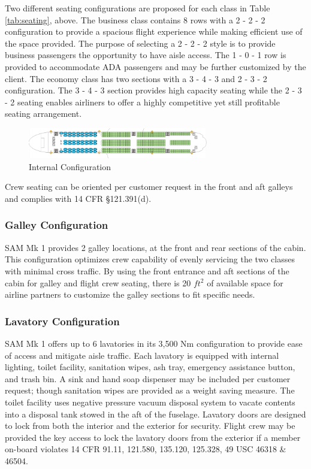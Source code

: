 Two different seating configurations are proposed for each class in Table \ref{tab:seating}, above.  The business class contains 8 rows with a 2 - 2 - 2 configuration to provide a spacious flight experience while making efficient use of the space provided.  The purpose of selecting a 2 - 2 - 2 style is to provide business passengers the opportunity to have aisle access.  The 1 - 0 - 1 row is provided to accommodate ADA passengers \cite{adaseating} and may be further customized by the client.  The economy class has two sections with a 3 - 4 - 3 and 2 - 3 - 2 configuration.  The 3 - 4 - 3 section provides high capacity seating while the 2 - 3 - 2 seating enables airliners to offer a highly competitive yet still profitable seating arrangement.

\begin{figure}[!h]
    \centering
    \includegraphics[width=0.7\textwidth]{Photos/Config undimensioned.png}
    \caption{Internal Configuration}
    \label{fig:internalConfig}
\end{figure}

Crew seating can be oriented per customer request in the front and aft galleys and complies with 14 CFR \S 121.391(d).

\subsubsection{Galley Configuration}
SAM Mk 1 provides 2 galley locations, at the front and rear sections of the cabin.  This configuration optimizes crew capability of evenly servicing the two classes with minimal cross traffic.  By using the front entrance and aft sections of the cabin for galley and flight crew seating, there is 20 $ft^2$ of available space for airline partners to customize the galley sections to fit specific needs.

\subsubsection{Lavatory Configuration}
SAM Mk 1 offers up to 6 lavatories in its 3,500 Nm configuration to provide ease of access and mitigate aisle traffic.  Each lavatory is equipped with internal lighting, toilet facility, sanitation wipes, ash tray, emergency assistance button, and trash bin.  A sink and hand soap dispenser may be included per customer request; though sanitation wipes are provided as a weight saving measure.  The toilet facility uses negative pressure vacuum disposal system to vacate contents into a disposal tank stowed in the aft of the fuselage.\cite{toilet}  Lavatory doors are designed to lock from both the interior and the exterior for security.  Flight crew may be provided the key access to lock the lavatory doors from the exterior if a member on-board violates 14 CFR 91.11, 121.580, 135.120, 125.328, 49 USC 46318 \& 46504.

